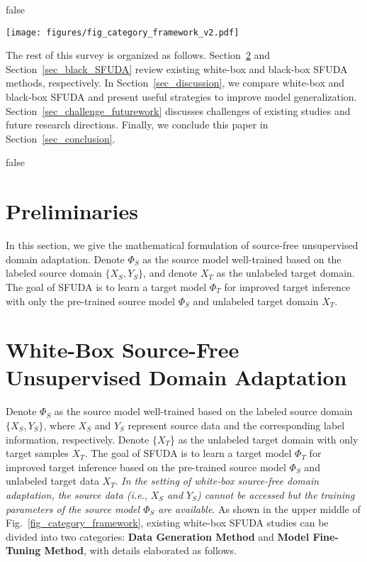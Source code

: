 \documentclass[10pt,journal,compsoc]{IEEEtran}
\def\ie{{\em i.e.}}
\begin{document}
\if false
\begin{figure*}[!t]
\setlength{\abovecaptionskip}{0pt}
\setlength{\belowcaptionskip}{-2pt}
\setlength{\abovedisplayskip}{-2pt}
\setlength{\belowdisplayskip}{-2pt}
	\centering
	\texttt{[image: figures/fig\_category\_framework\_v2.pdf]}
	\caption{The taxonomy of the existing source-free unsupervised domain adaptation (SFUDA) methods, as well as challenges and future outlooks.}
	\label{fig_category_framework}
\end{figure*}
\fi

The rest of this survey is organized as follows.  
Section~\ref{sec_white_SFUDA} and Section~\ref{sec_black_SFUDA} review existing white-box and black-box SFUDA methods, respectively.
In Section~\ref{sec_discussion}, we compare white-box and black-box SFUDA and present useful strategies to improve model generalization.
Section~\ref{sec_challenge_futurework} discusses challenges of existing studies and future research directions. 
Finally, we conclude this paper in Section~\ref{sec_conclusion}.


\if false
\section{Preliminaries}\label{sec_preliminaries}
In this section, we give the mathematical formulation of source-free unsupervised domain adaptation.
Denote $\Phi_S$ as the source model well-trained based on the labeled source domain $\{X_S, Y_S\}$, and denote $X_T$ as the unlabeled target domain.
The goal of SFUDA is to learn a target model $\Phi_T$ for improved target inference with only the pre-trained source model $\Phi_S$ and unlabeled target domain $X_T$.
\fi
 
 
\section{White-Box Source-Free Unsupervised Domain Adaptation}\label{sec_white_SFUDA}
Denote $\Phi_S$ as the source model well-trained based on the labeled source domain $\{X_S, Y_S\}$, where  $X_S$ and $Y_S$ represent source data and the corresponding label information, respectively. 
Denote $\{X_T$\} as the unlabeled target domain with only target samples $X_T$. 
The goal of SFUDA is to learn a target model $\Phi_T$ for improved target inference based on the pre-trained source model $\Phi_S$ and unlabeled target data $X_T$.
\emph{In the setting of white-box source-free domain adaptation, the source data (}\ie, \emph{$X_S$ and $Y_S$) cannot be accessed but the training parameters of the source model $\Phi_S$ are available}.
As shown in the upper middle of Fig.~\ref{fig_category_framework}, existing white-box SFUDA studies can be divided into two categories: \textbf{Data Generation Method} and %
\textbf{Model Fine-Tuning Method}, with details elaborated as follows.
\end{document}
